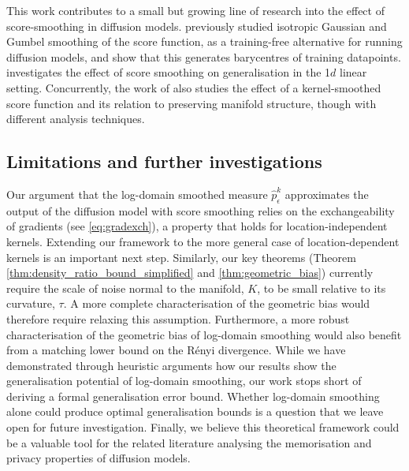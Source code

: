 \documentclass[10pt]{article}
\theoremstyle{plain}
\theoremstyle{definition}
\theoremstyle{remark}
\begin{document}
This work contributes to a small but growing line of research into the effect of score-smoothing in diffusion models.
\citet{scarvelis2023closedformdiffusionmodels} previously studied isotropic Gaussian and Gumbel smoothing of the score function, as a training-free alternative for running diffusion models, and show that this generates barycentres of training datapoints. \citet{chen2025interpolationeffectscoresmoothing} investigates the effect of score smoothing on generalisation in the 1$d$ linear setting.
Concurrently, the work of \citet{gabriel2025kernelsmoothedscoresdenoisingdiffusion} also studies the effect of a kernel-smoothed score function and its relation to preserving manifold structure, though with different analysis techniques.



\subsection{Limitations and further investigations}

Our argument that the log-domain smoothed measure \(\hat{p}^k_{\epsilon}\) approximates the output of the diffusion model with score smoothing relies on the exchangeability of gradients (see \eqref{eq:gradexch}), a property that holds for location-independent kernels. Extending our framework to the more general case of location-dependent kernels is an important next step. Similarly, our key theorems (Theorem \ref{thm:density_ratio_bound_simplified} and \ref{thm:geometric_bias}) currently require the scale of noise normal to the manifold, \(K\), to be small relative to its curvature, \(\tau\). A more complete characterisation of the geometric bias would therefore require relaxing this assumption. Furthermore, a more robust characterisation of the geometric bias of log-domain smoothing would also benefit from a matching lower bound on the R\'enyi divergence. While we have demonstrated through heuristic arguments how our results show the generalisation potential of log-domain smoothing, our work stops short of deriving a formal generalisation error bound. Whether log-domain smoothing alone could produce optimal generalisation bounds is a question that we leave open for future investigation. Finally, we believe this theoretical framework could be a valuable tool for the related literature analysing the memorisation and privacy properties of diffusion models.
\end{document}
